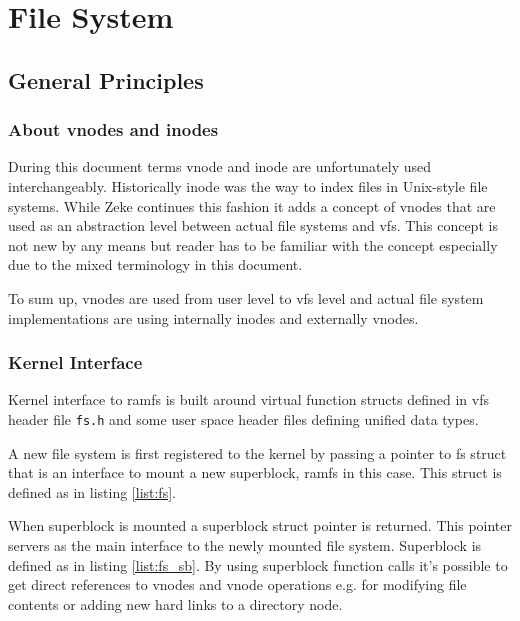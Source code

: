 \part{File System}

\chapter{General Principles}

\section{About vnodes and inodes}

During this document terms \acs{vnode} and \acs{inode} are unfortunately used
interchangeably. Historically inode was the way to index files in Unix-style
file systems.\cite{Wikipedia:inode} While Zeke continues this fashion it adds
a concept of vnodes that are used as an abstraction level between actual file
systems and \acf{vfs}. This concept is not new by any means but reader has to
be familiar with the concept especially due to the mixed terminology in this
document.

To sum up, vnodes are used from user level to \acs{vfs} level and actual file
system implementations are using internally inodes and externally vnodes.

\section{Kernel Interface}

Kernel interface to ramfs is built around virtual function structs defined in
\acs{vfs} header file \verb+fs.h+ and some user space header files defining
unified data types.

A new file system is first registered to the kernel by passing a pointer to
fs struct that is an interface to mount a new superblock, ramfs in this case.
This struct is defined as in listing \ref{list:fs}.

When superblock is mounted a superblock struct pointer is returned. This pointer
servers as the main interface to the newly mounted file system. Superblock is
defined as in listing \ref{list:fs_sb}. By using superblock function calls it's
possible to get direct references to vnodes and \acs{vnode} operations e.g. for
modifying file contents or adding new hard links to a directory node.





